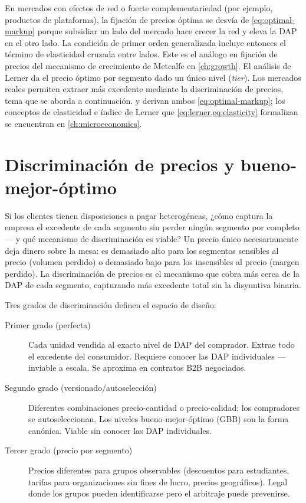 En mercados con efectos de red o fuerte complementariedad (por ejemplo, productos de plataforma), la fijación de precios óptima se desvía de \cref{eq:optimal-markup} porque subsidiar un lado del mercado hace crecer la red y eleva la DAP en el otro lado. La condición de primer orden generalizada incluye entonces el término de elasticidad cruzada entre lados. Este es el análogo en fijación de precios del mecanismo de crecimiento de Metcalfe en \cref{ch:growth}. El análisis de Lerner da el precio óptimo por segmento dado un único nivel (\emph{tier}). Los mercados reales permiten extraer más excedente mediante la discriminación de precios, tema que se aborda a continuación. \textcite{nagle2023strategy} y \textcite{pindyck2017} derivan ambos \cref{eq:optimal-markup}; los conceptos de elasticidad e índice de Lerner que \cref{eq:lerner,eq:elasticity} formalizan se encuentran en \cref{ch:microeconomics}.

\section{Discriminación de precios y bueno-mejor-óptimo}\label{sec:price-discrimination}

Si los clientes tienen disposiciones a pagar heterogéneas, ¿cómo captura la empresa el excedente de cada segmento sin perder ningún segmento por completo --- y qué mecanismo de discriminación es viable? Un precio único necesariamente deja dinero sobre la mesa: es demasiado alto para los segmentos sensibles al precio (volumen perdido) o demasiado bajo para los insensibles al precio (margen perdido). La discriminación de precios es el mecanismo que cobra más cerca de la DAP de cada segmento, capturando más excedente total sin la disyuntiva binaria.

Tres grados de discriminación definen el espacio de diseño:

\begin{description}
  \item[Primer grado (perfecta)] Cada unidad vendida al exacto nivel de DAP del comprador. Extrae todo el excedente del consumidor. Requiere conocer las DAP individuales --- inviable a escala. Se aproxima en contratos B2B negociados.
  \item[Segundo grado (versionado/autoselección)] Diferentes combinaciones precio-cantidad o precio-calidad; los compradores se autoseleccionan. Los niveles bueno-mejor-óptimo (GBB) son la forma canónica. Viable sin conocer las DAP individuales.
  \item[Tercer grado (precio por segmento)] Precios diferentes para grupos observables (descuentos para estudiantes, tarifas para organizaciones sin fines de lucro, precios geográficos). Legal donde los grupos pueden identificarse pero el arbitraje puede prevenirse.
\end{description}

